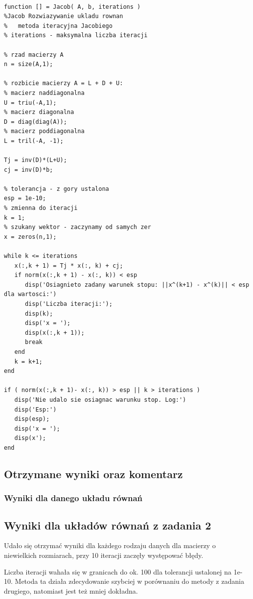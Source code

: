 \documentclass[11pt]{article} %
\begin{document}
\begin{verbatim}

function [] = Jacob( A, b, iterations )
%Jacob Rozwiazywanie ukladu rownan
%   metoda iteracyjna Jacobiego
% iterations - maksymalna liczba iteracji

% rzad macierzy A
n = size(A,1);

% rozbicie macierzy A = L + D + U:
% macierz naddiagonalna
U = triu(-A,1);
% macierz diagonalna
D = diag(diag(A));
% macierz poddiagonalna
L = tril(-A, -1);

Tj = inv(D)*(L+U);
cj = inv(D)*b;

% tolerancja - z gory ustalona
esp = 1e-10;
% zmienna do iteracji
k = 1;
% szukany wektor - zaczynamy od samych zer
x = zeros(n,1);

while k <= iterations
   x(:,k + 1) = Tj * x(:, k) + cj;
   if norm(x(:,k + 1) - x(:, k)) < esp
      disp('Osiagnieto zadany warunek stopu: ||x^(k+1) - x^(k)|| < esp dla wartosci:')
      disp('Liczba iteracji:');
      disp(k); 
      disp('x = ');
      disp(x(:,k + 1));
      break
   end
   k = k+1;
end

if ( norm(x(:,k + 1)- x(:, k)) > esp || k > iterations )
   disp('Nie udalo sie osiagnac warunku stop. Log:')
   disp('Esp:')
   disp(esp);
   disp('x = ');
   disp(x');
end

\end{verbatim}

\subsection{Otrzymane wyniki oraz komentarz}
\subsubsection{Wyniki dla danego układu równań}


\subsection{Wyniki dla układów równań z zadania 2}
Udało się otrzymać wyniki dla każdego rodzaju danych dla macierzy o niewielkich rozmiarach, przy 10 iteracji zaczęły występować błędy.

Liczba iteracji wahała się w granicach do ok. 100 dla tolerancji ustalonej na 1e-10.
Metoda ta działa zdecydowanie szybciej w porównaniu do metody z zadania drugiego, natomiast jest też mniej dokładna.
\end{document}
